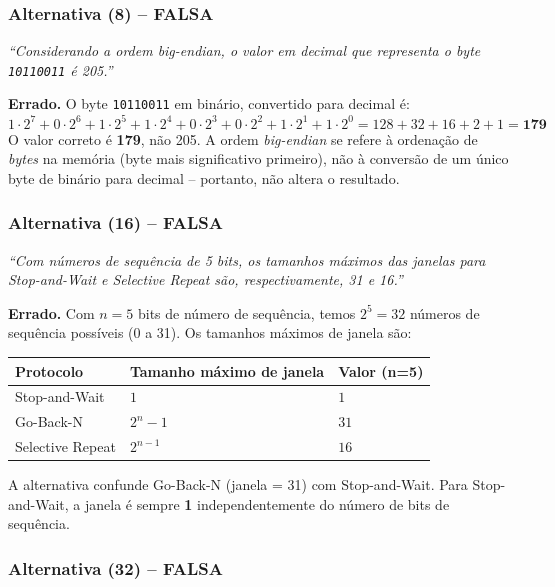 \documentclass[12pt,a4paper]{article}
\begin{document}
\subsubsection*{Alternativa (8) -- \textcolor{red!70!black}{\textbf{FALSA}}}

\textit{``Considerando a ordem big-endian, o valor em decimal que representa o byte \texttt{10110011} é 205.''}

\textbf{Errado.} O byte \texttt{10110011} em binário, convertido para decimal é:
\[
    1\cdot2^7 + 0\cdot2^6 + 1\cdot2^5 + 1\cdot2^4 + 0\cdot2^3 + 0\cdot2^2 + 1\cdot2^1 + 1\cdot2^0
    = 128 + 32 + 16 + 2 + 1 = \mathbf{179}
\]
O valor correto é \textbf{179}, não 205. A ordem \textit{big-endian} se refere à ordenação de \textit{bytes} na memória (byte mais significativo primeiro), não à conversão de um único byte de binário para decimal -- portanto, não altera o resultado.

\subsubsection*{Alternativa (16) -- \textcolor{red!70!black}{\textbf{FALSA}}}

\textit{``Com números de sequência de 5 bits, os tamanhos máximos das janelas para Stop-and-Wait e Selective Repeat são, respectivamente, 31 e 16.''}

\textbf{Errado.} Com $n = 5$ bits de número de sequência, temos $2^5 = 32$ números de sequência possíveis (0 a 31). Os tamanhos máximos de janela são:

\begin{center}
\begin{tabular}{lll}
\toprule
\textbf{Protocolo} & \textbf{Tamanho máximo de janela} & \textbf{Valor (n=5)} \\
\midrule
Stop-and-Wait & $1$ & $1$ \\
Go-Back-N & $2^n - 1$ & $31$ \\
Selective Repeat & $2^{n-1}$ & $16$ \\
\bottomrule
\end{tabular}
\end{center}

A alternativa confunde Go-Back-N (janela = 31) com Stop-and-Wait. Para Stop-and-Wait, a janela é sempre \textbf{1} independentemente do número de bits de sequência.

\subsubsection*{Alternativa (32) -- \textcolor{red!70!black}{\textbf{FALSA}}}
\end{document}
